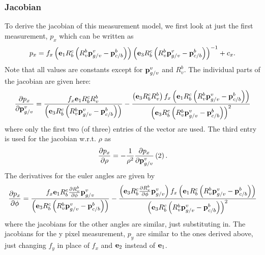 \subsubsection{Jacobian}
To derive  the jacobian of this measurement model, we first look at just the
first measurement, $p_x$ which can be written as
\begin{equation}
    p_x = f_x \left(\boldsymbol{\mathrm{e}}_1 R_b^c \left(R_v^b \boldsymbol{\mathrm{p}}_{g/v}^v -
      \boldsymbol{\mathrm{p}}_{c/b}^b\right)\right) \left(\boldsymbol{\mathrm{e}}_3 R_b^c \left(R_v^b \boldsymbol{\mathrm{p}}_{g/v}^v -
      \boldsymbol{\mathrm{p}}_{c/b}^b\right)\right)^{-1} + c_x.
\end{equation}
Note that all values are constants except for $\boldsymbol{\mathrm{p}}_{g/v}^v$ and $R_v^b$.
The individual parts of the jacobian are given here:
\begin{equation}
  \frac{\partial p_x}{\partial \boldsymbol{\mathrm{p}}_{g/v}^v} =
  \frac{f_x \boldsymbol{\mathrm{e}}_1 R_b^c R_v^b}
    {\left(\boldsymbol{\mathrm{e}}_3 R_b^c \left(R_v^b \boldsymbol{\mathrm{p}}_{g/v}^v -
    \boldsymbol{\mathrm{p}}_{c/b}^b\right)\right)}
    - \frac{\left(\boldsymbol{\mathrm{e}}_3 R_b^c R_v^b \right) f_x \left(\boldsymbol{\mathrm{e}}_1 R_b^c \left(R_v^b \boldsymbol{\mathrm{p}}_{g/v}^v -
        \boldsymbol{\mathrm{p}}_{c/b}^b\right)\right)} {\left(\boldsymbol{\mathrm{e}}_3 R_b^c \left(R_v^b \boldsymbol{\mathrm{p}}_{g/v}^v -
  \boldsymbol{\mathrm{p}}_{c/b}^b\right)\right)^2}
\end{equation}
where only the first two (of three) entries of the vector are used. The third
entry is used for the jacobian w.r.t. $\rho$ as
\begin{equation}
  \frac{\partial p_x}{\partial \rho} = -\frac{1}{\rho^2} \frac{\partial p_x}{\partial
  \boldsymbol{\mathrm{p}}_{g/v}^v}\left(2\right).
\end{equation}
The derivatives for the euler angles are given by
\begin{equation}
  \frac{\partial p_x}{\partial \phi} =
  \frac{f_x \boldsymbol{\mathrm{e}}_1 R_b^c \frac{\partial R_v^b}{\partial \phi} \boldsymbol{\mathrm{p}}_{g/v}^v}
    {\left(\boldsymbol{\mathrm{e}}_3 R_b^c \left(R_v^b \boldsymbol{\mathrm{p}}_{g/v}^v -
    \boldsymbol{\mathrm{p}}_{c/b}^b\right)\right)}
    - \frac{\left(\boldsymbol{\mathrm{e}}_3 R_b^c \frac{\partial R_v^b}{\partial \phi} \boldsymbol{\mathrm{p}}_{g/v}^v \right) f_x \left(\boldsymbol{\mathrm{e}}_1 R_b^c \left(R_v^b \boldsymbol{\mathrm{p}}_{g/v}^v -
        \boldsymbol{\mathrm{p}}_{c/b}^b\right)\right)} {\left(\boldsymbol{\mathrm{e}}_3 R_b^c \left(R_v^b \boldsymbol{\mathrm{p}}_{g/v}^v -
  \boldsymbol{\mathrm{p}}_{c/b}^b\right)\right)^2}
\end{equation}
where the jacobians for the other angles are similar, just substituting in. The
jacobians for the y pixel measurement, $p_y$ are similar to the ones derived
above, just changing $f_y$ in place of $f_x$ and $\boldsymbol{\mathrm{e}}_2$ instead of $\boldsymbol{\mathrm{e}}_1$.



